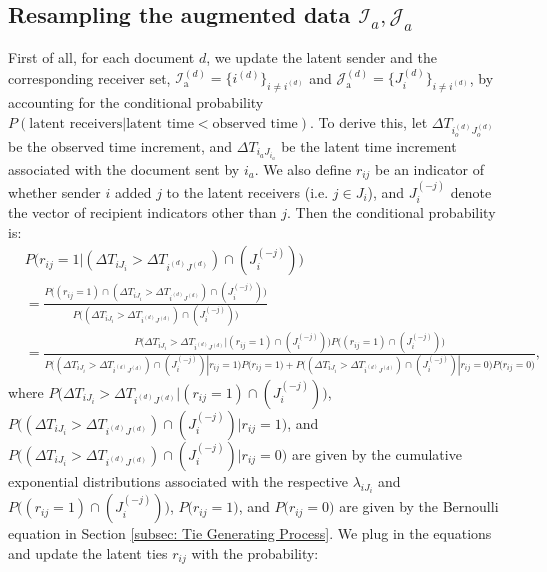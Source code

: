 \documentclass[a4paper]{article}
\begin{document}
   \subsection{Resampling the augmented data $\mathcal{I}_a, \mathcal{J}_a$} \label{subsec: Data augmentation}
   First of all, for each document $d$, we update the latent sender and the corresponding receiver set,  $\mathcal{I}^{(d)}_{\mbox{a}}=\{i^{(d)}\}_{i\neq i^{(d)}}$ and  $\mathcal{J}^{(d)}_{\mbox{a}}=\{J_i^{(d)}\}_{i\neq i^{(d)}}$, by accounting for the conditional probability $P(\mbox{latent receivers}| \mbox{latent time} < \mbox{observed time})$. To derive this, let $\Delta T_{i_o^{(d)}{J_o^{(d)}}}$ be the observed time increment, and $\Delta T_{i_a{J_{i_a}}}$ be the latent time increment associated with the document sent by $i_a$. We also define $r_{ij}$ be an indicator of whether sender $i$ added $j$ to the latent receivers (i.e. $j \in J_i$), and $J_i^{(-j)}$ denote the vector of recipient indicators other than $j$. Then the conditional probability is:\\
   \begin{equation}
   	\begin{split}
   		&P\Big(r_{ij}=1|(\Delta T_{i{J_i}} > \Delta T_{i^{(d)}{J^{(d)}}})\cap( J_i^{(-j)})\Big)\\ &=\frac{P\Big((r_{ij}=1)\cap (\Delta T_{i{J_i}} > \Delta T_{i^{(d)}{J^{(d)}}})\cap (J_i^{(-j)})\Big)}{P\Big((\Delta T_{i{J_i}} > \Delta T_{i^{(d)}{J^{(d)}}})\cap (J_i^{(-j)})\Big)}\\
   		& = \frac{P\Big(\Delta T_{i{J_i}} > \Delta T_{i^{(d)}{J^{(d)}}} | (r_{ij}=1)\cap (J_i^{(-j)})\Big)P\Big((r_{ij}=1) \cap (J_i^{(-j)})\Big)}{P\Big((\Delta T_{i{J_i}} > \Delta T_{i^{(d)}{J^{(d)}}})\cap (J_i^{(-j)})|r_{ij}=1\Big)P\Big(r_{ij}=1\Big)+P\Big( (\Delta T_{i{J_i}} > \Delta T_{i^{(d)}{J^{(d)}}}) \cap (J_i^{(-j)})|r_{ij}=0\Big)P\Big(r_{ij}=0\Big)},
   	\end{split}
   \end{equation}
   where $P\Big(\Delta T_{i{J_i}} > \Delta T_{i^{(d)}{J^{(d)}}} | (r_{ij}=1)\cap (J_i^{(-j)})\Big)$, $P\Big((\Delta T_{i{J_i}}> \Delta T_{i^{(d)}{J^{(d)}}})\cap (J_i^{(-j)})|r_{ij}=1\Big)$, and $P\Big((\Delta T_{i{J_i}}> \Delta T_{i^{(d)}{J^{(d)}}})\cap (J_i^{(-j)})|r_{ij}=0\Big)$ are given by the cumulative exponential distributions associated with the respective $\lambda_{iJ_i}$ and $P\Big((r_{ij}=1) \cap (J_i^{(-j)})\Big)$,  $P\Big(r_{ij}=1\Big)$, and $P\Big(r_{ij}=0\Big)$ are given by the Bernoulli equation in Section \ref{subsec: Tie Generating Process}. We plug in the equations and update the latent ties $r_{ij}$ with the probability:
\end{document}
